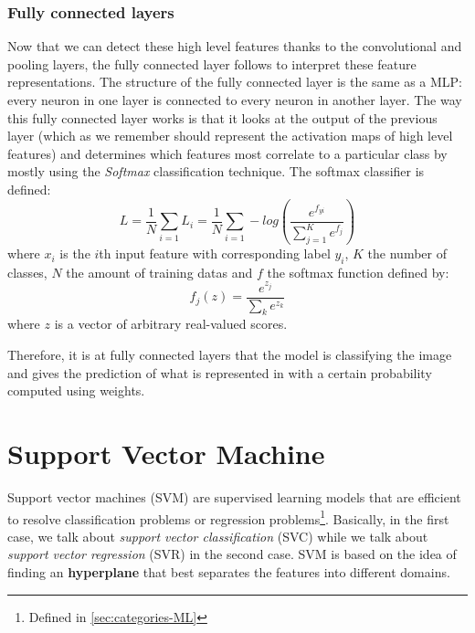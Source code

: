 \documentclass[11pt, openany]{report}
\theoremstyle{plain}
\theoremstyle{definition}
\theoremstyle{remark}
\begin{document}
\newpage
\subsubsection{Fully connected layers} \label{sec:fully-connected-layer}
Now that we can detect these high level features thanks to the convolutional and pooling layers, the fully connected layer follows to interpret these feature representations. The structure of the fully connected layer is the same as a MLP: every neuron in one layer is connected to every neuron in another layer. The way this fully connected layer works is that it looks at the output of the previous layer (which as we remember should represent the activation maps of high level features) and determines which features most correlate to a particular class by mostly using the \textit{Softmax} classification technique.
The softmax classifier is defined: 
$$ L = \frac{1}{N} \sum_{i=1} L_{i} =  \frac{1}{N} \sum_{i = 1} - log \left(  \frac{e^{f_{yi}}}{\sum_{j=1}^K e^{f_{j}}}  \right) $$ 
where $x_{i}$ is the $i$th input feature with corresponding label $y_{i}$, $K$ the number of classes, $N$ the amount of training datas and $f$ the softmax function defined by: 
$$ f_{j}(z) = \frac{e^{z_{j}}}{\sum_{k} e^{z_{k}}} $$ where $z$ is a vector of arbitrary real-valued scores. 

Therefore, it is at fully connected layers that the model is classifying the image and gives the prediction of what is represented in with a certain probability computed using weights.






\newpage
\section{Support Vector Machine} \label{sec:svm}
Support vector machines (SVM) are supervised learning models that are efficient to resolve classification problems or regression problems\footnote{Defined in \autoref{sec:categories-ML}}. Basically, in the first case, we talk about \textit{support vector classification} (SVC) while we talk about \textit{support vector regression} (SVR) in the second case. SVM is based on the idea of finding an \textbf{hyperplane} that best separates the features into different domains. 
\end{document}
